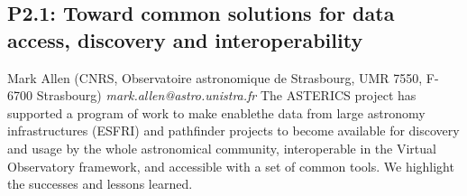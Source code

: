 \documentclass{report}
\begin{document}
\subsection*{P2.1: Toward common solutions for data access, discovery and interoperability}
\bigskip
Mark Allen (CNRS, Observatoire astronomique de Strasbourg, UMR 7550, F-6700 Strasbourg) \newline   \newline   \newline   \newline  \newline  \newline\newline
{\it mark.allen@astro.unistra.fr}\newline
\newline\newline
The ASTERICS project has supported a program of work to make enablethe data from large astronomy infrastructures (ESFRI) and pathfinder projects to become available for discovery and usage by the whole astronomical community, interoperable in the Virtual Observatory framework, and accessible with a set of common tools.  We highlight the successes and lessons learned.\newline
\newpage
\end{document}
